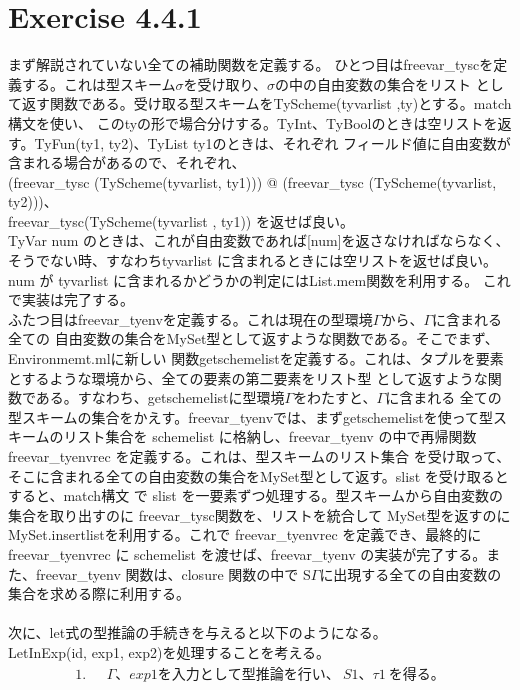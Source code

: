 \documentclass{jreport}
\begin{document}
\section{Exercise 4.4.1}
まず解説されていない全ての補助関数を定義する。
ひとつ目はfreevar\_tyscを定義する。これは型スキーム$\sigma$を受け取り、$\sigma$の中の自由変数の集合をリスト
として返す関数である。受け取る型スキームをTyScheme(tyvarlist ,ty)とする。match構文を使い、
このtyの形で場合分けする。TyInt、TyBoolのときは空リストを返す。TyFun(ty1, ty2)、TyList ty1のときは、それぞれ
フィールド値に自由変数が含まれる場合があるので、それぞれ、\\
(freevar\_tysc (TyScheme(tyvarlist, ty1))) @ (freevar\_tysc (TyScheme(tyvarlist, ty2)))、\\
freevar\_tysc(TyScheme(tyvarlist , ty1))
を返せば良い。\\
TyVar num のときは、これが自由変数であれば[num]を返さなければならなく、そうでない時、すなわちtyvarlist
に含まれるときには空リストを返せば良い。num が tyvarlist に含まれるかどうかの判定にはList.mem関数を利用する。
これで実装は完了する。\\
ふたつ目はfreevar\_tyenvを定義する。これは現在の型環境$\Gamma$から、$\Gamma$に含まれる全ての
自由変数の集合をMySet型として返すような関数である。そこでまず、Environmemt.mlに新しい
関数getschemelistを定義する。これは、タプルを要素とするような環境から、全ての要素の第二要素をリスト型
として返すような関数である。すなわち、getschemelistに型環境$\Gamma$をわたすと、$\Gamma$に含まれる
全ての型スキームの集合をかえす。freevar\_tyenvでは、まずgetschemelistを使って型スキームのリスト集合を
schemelist に格納し、freevar\_tyenv の中で再帰関数 freevar\_tyenvrec を定義する。これは、型スキームのリスト集合
を受け取って、そこに含まれる全ての自由変数の集合をMySet型として返す。slist を受け取るとすると、match構文
で slist を一要素ずつ処理する。型スキームから自由変数の集合を取り出すのに freevar\_tysc関数を、リストを統合して
MySet型を返すのにMySet.insertlistを利用する。これで freevar\_tyenvrec を定義でき、最終的に freevar\_tyenvrec
に schemelist を渡せば、freevar\_tyenv の実装が完了する。また、freevar\_tyenv 関数は、closure 関数の中で
S$\Gamma$に出現する全ての自由変数の集合を求める際に利用する。
\\
\\
次に、let式の型推論の手続きを与えると以下のようになる。\\
LetInExp(id, exp1, exp2)を処理することを考える。
\begin{equation}
  \begin{split}
    1. \ \ \ &\Gamma、exp1 を入力として型推論を行い、\ S1、\tau1 \ を得る。
  \end{split}
\end{equation}
\end{document}
